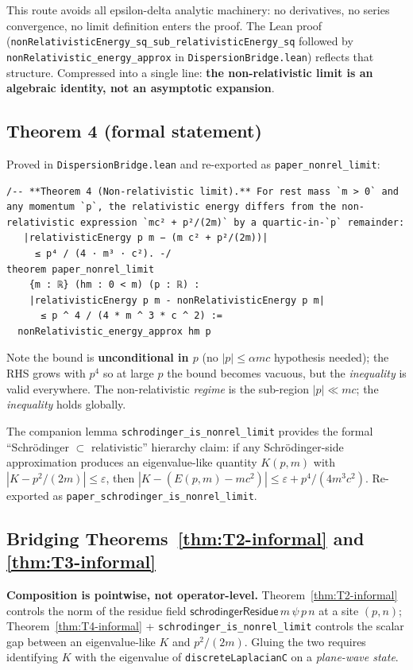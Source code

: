 \documentclass[11pt,a4paper,twoside]{article}
\theoremstyle{definition}
\newcommand{\code}[1]{\texttt{#1}}
\begin{document}
This route avoids all epsilon-delta analytic machinery: no
derivatives, no series convergence, no limit definition enters the
proof. The Lean proof
(\code{nonRelativisticEnergy\_sq\_sub\_relativisticEnergy\_sq} followed
by \code{nonRelativistic\_energy\_approx} in
\code{DispersionBridge.lean}) reflects that structure. Compressed
into a single line: \textbf{the non-relativistic limit is an algebraic
identity, not an asymptotic expansion}.

\subsection{Theorem 4 (formal statement)}\label{sec:T4}

Proved in \code{DispersionBridge.lean} and re-exported as
\code{paper\_nonrel\_limit}:
\begin{lstlisting}
/-- **Theorem 4 (Non-relativistic limit).** For rest mass `m > 0` and
any momentum `p`, the relativistic energy differs from the non-
relativistic expression `mc² + p²/(2m)` by a quartic-in-`p` remainder:
   |relativisticEnergy p m − (m c² + p²/(2m))|
     ≤ p⁴ / (4 · m³ · c²). -/
theorem paper_nonrel_limit
    {m : ℝ} (hm : 0 < m) (p : ℝ) :
    |relativisticEnergy p m - nonRelativisticEnergy p m|
      ≤ p ^ 4 / (4 * m ^ 3 * c ^ 2) :=
  nonRelativistic_energy_approx hm p
\end{lstlisting}

Note the bound is \textbf{unconditional in $p$} (no $|p|\le\alpha mc$
hypothesis needed); the RHS grows with $p^{4}$ so at large $p$ the
bound becomes vacuous, but the \emph{inequality} is valid everywhere.
The non-relativistic \emph{regime} is the sub-region $|p|\ll mc$; the
\emph{inequality} holds globally.

The companion lemma \code{schrodinger\_is\_nonrel\_limit} provides the
formal ``Schr\"odinger $\subset$ relativistic'' hierarchy claim: if
any Schr\"odinger-side approximation produces an eigenvalue-like
quantity $K(p,m)$ with $|K-p^{2}/(2m)|\le\varepsilon$, then
$|K-(E(p,m)-mc^{2})|\le\varepsilon+p^{4}/(4m^{3}c^{2})$. Re-exported
as \code{paper\_schrodinger\_is\_nonrel\_limit}.

\subsection{Bridging Theorems~\ref{thm:T2-informal} and
\ref{thm:T3-informal}}\label{sec:nonrel-bridge}

\textbf{Composition is pointwise, not operator-level.}
Theorem~\ref{thm:T2-informal} controls the norm of the residue field
$\mathsf{schrodingerResidue}\,m\,\psi\,p\,n$ at a site $(p,n)$;
Theorem~\ref{thm:T4-informal} + \code{schrodinger\_is\_nonrel\_limit}
controls the scalar gap between an eigenvalue-like $K$ and
$p^{2}/(2m)$. Gluing the two requires identifying $K$ with the
eigenvalue of \code{discreteLaplacianC} on a \emph{plane-wave state}.
\end{document}
